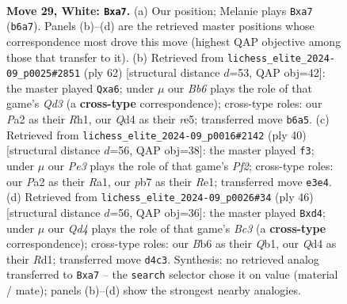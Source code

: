 \documentclass[11pt]{article}
\begin{document}
\clearpage

\begin{figure}[p]\centering
\begin{subfigure}{0.46\textwidth}\centering
\resizebox{\linewidth}{!}{%
\newchessgame
\chessboard[
  setfen={1qr5/rp3pk1/pB2pb2/8/3Q3p/4PP2/PP4PP/R3R1K1 w - - 2 29},
  showmover=false,
  pgfstyle=straightmove, color=movearrow, markmove={b6-a7}
]}
\caption{}
\end{subfigure}\hfill
\begin{subfigure}{0.46\textwidth}\centering
\resizebox{\linewidth}{!}{%
\newchessgame
\chessboard[
  setfen={5r2/pp2p1bk/q5p1/4r2p/P7/2PQB2P/1P3PP1/2R1K2R w K - 0 32},
  showmover=false,
  pgfstyle=straightmove, color=movearrow, markmove={d3-a6}
]}
\caption{}
\end{subfigure}
\\[4pt]
\begin{subfigure}{0.46\textwidth}\centering
\resizebox{\linewidth}{!}{%
\newchessgame
\chessboard[
  setfen={5rk1/6pp/pq2pr2/1pbp4/7P/P1P1B3/1P2QPP1/R3R1K1 w - - 2 21},
  showmover=false,
  pgfstyle=straightmove, color=movearrow, markmove={f2-f3}
]}
\caption{}
\end{subfigure}\hfill
\begin{subfigure}{0.46\textwidth}\centering
\resizebox{\linewidth}{!}{%
\newchessgame
\chessboard[
  setfen={5rk1/p5p1/1p1r3p/2pq4/3b4/2B2P2/PP4PP/1Q1R1R1K w - - 2 24},
  showmover=false,
  pgfstyle=straightmove, color=movearrow, markmove={c3-d4}
]}
\caption{}
\end{subfigure}
\caption{\textbf{Move 29, White: \texttt{Bxa7}.} (a) Our position; Melanie plays \texttt{Bxa7} (\texttt{b6a7}). Panels (b)--(d) are the retrieved master positions whose correspondence most drove this move (highest QAP objective among those that transfer to it). (b) Retrieved from \texttt{lichess\_elite\_2024-09\_p0025\#2851} (ply 62) [structural distance $d$=53, QAP obj=42]: the master played \texttt{Qxa6}; under $\mu$ our \emph{Bb6} plays the role of that game's \emph{Qd3} (a \textbf{cross-type} correspondence); cross-type roles: our \emph{P}a2 as their \emph{R}h1, our \emph{Q}d4 as their \emph{r}e5; transferred move \texttt{b6a5}. (c) Retrieved from \texttt{lichess\_elite\_2024-09\_p0016\#2142} (ply 40) [structural distance $d$=56, QAP obj=38]: the master played \texttt{f3}; under $\mu$ our \emph{Pe3} plays the role of that game's \emph{Pf2}; cross-type roles: our \emph{P}a2 as their \emph{R}a1, our \emph{p}b7 as their \emph{R}e1; transferred move \texttt{e3e4}. (d) Retrieved from \texttt{lichess\_elite\_2024-09\_p0026\#34} (ply 46) [structural distance $d$=56, QAP obj=36]: the master played \texttt{Bxd4}; under $\mu$ our \emph{Qd4} plays the role of that game's \emph{Bc3} (a \textbf{cross-type} correspondence); cross-type roles: our \emph{B}b6 as their \emph{Q}b1, our \emph{Q}d4 as their \emph{R}d1; transferred move \texttt{d4c3}. Synthesis: no retrieved analog transferred to \texttt{Bxa7} -- the \texttt{search} selector chose it on value (material / mate); panels (b)--(d) show the strongest nearby analogies.}
\label{fig:thought-m56}
\end{figure}
\end{document}
